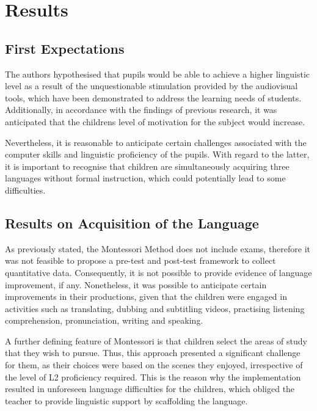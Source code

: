 \section{Results}\label{sec-results}

\subsection{First Expectations}\label{sub-sec-firstexpectations}

The authors hypothesised that pupils would be able to achieve a higher
linguistic level as a result of the unquestionable stimulation provided
by the audiovisual tools, which have been demonstrated to address the
learning needs of students. Additionally, in accordance with the
findings of previous research, it was anticipated that the
children\textquotesingle s level of motivation for the subject would
increase.

Nevertheless, it is reasonable to anticipate certain challenges
associated with the computer skills and linguistic proficiency of the
pupils. With regard to the latter, it is important to recognise that
children are simultaneously acquiring three languages without formal
instruction, which could potentially lead to some difficulties.

\subsection{Results on Acquisition of the Language}\label{sub-sec-resultsonacquisition}

As previously stated, the Montessori Method does not include exams,
therefore it was not feasible to propose a pre-test and post-test
framework to collect quantitative data. Consequently, it is not possible
to provide evidence of language improvement, if any. Nonetheless, it was
possible to anticipate certain improvements in their productions, given
that the children were engaged in activities such as translating,
dubbing and subtitling videos, practising listening comprehension,
pronunciation, writing and speaking.

A further defining feature of Montessori is that children select the
areas of study that they wish to pursue. Thus, this approach presented a
significant challenge for them, as their choices were based on the
scenes they enjoyed, irrespective of the level of L2 proficiency
required. This is the reason why the implementation resulted in
unforeseen language difficulties for the children, which obliged the
teacher to provide linguistic support by scaffolding the language.


